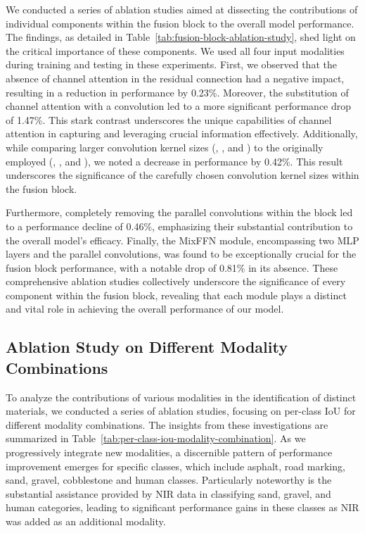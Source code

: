\documentclass{article}
\begin{document}
We conducted a series of ablation studies aimed at dissecting the contributions of individual components within the fusion block to the overall model performance. The findings, as detailed in Table~\ref{tab:fusion-block-ablation-study}, shed light on the critical importance of these components. We used all four input modalities during training and testing in these experiments. First, we observed that the absence of channel attention in the residual connection had a negative impact, resulting in a reduction in performance by 0.23\%. Moreover, the substitution of channel attention with a  convolution led to a more significant performance drop of 1.47\%. This stark contrast underscores the unique capabilities of channel attention in capturing and leveraging crucial information effectively. Additionally, while comparing larger convolution kernel sizes (, , and ) to the originally employed (, , and ), we noted a decrease in performance by 0.42\%. This result underscores the significance of the carefully chosen convolution kernel sizes within the fusion block.

Furthermore, completely removing the parallel convolutions within the block led to a performance decline of 0.46\%, emphasizing their substantial contribution to the overall model's efficacy. Finally, the MixFFN module, encompassing two MLP layers and the parallel convolutions, was found to be exceptionally crucial for the fusion block performance, with a notable drop of 0.81\% in its absence. These comprehensive ablation studies collectively underscore the significance of every component within the fusion block, revealing that each module plays a distinct and vital role in achieving the overall performance of our model. 

\subsection{Ablation Study on Different Modality Combinations}

To analyze the contributions of various modalities in the identification of distinct materials, we conducted a series of ablation studies, focusing on per-class IoU for different modality combinations. The insights from these investigations are summarized in Table~\ref{tab:per-class-iou-modality-combination}. As we progressively integrate new modalities, a discernible pattern of performance improvement emerges for specific classes, which include asphalt, road marking, sand, gravel, cobblestone and human classes. Particularly noteworthy is the substantial assistance provided by NIR data in classifying sand, gravel, and human categories, leading to significant performance gains in these classes as NIR was added as an additional modality. 
\end{document}
